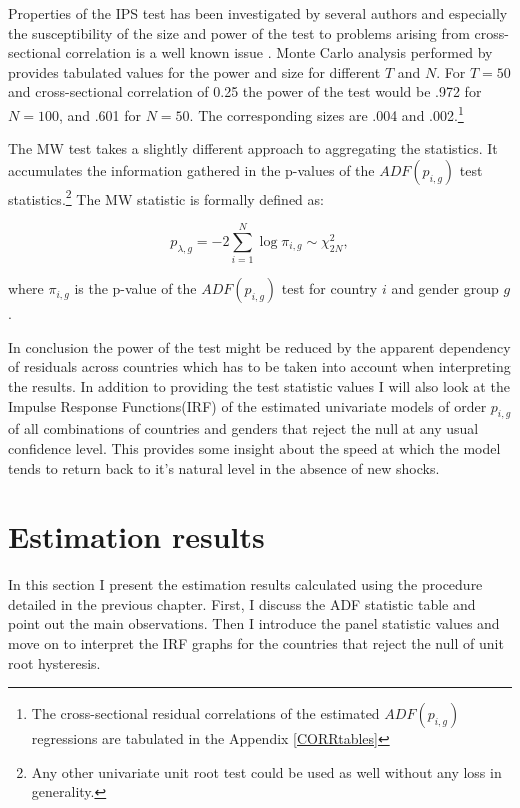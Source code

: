 \documentclass[12pt,a4paper,english]{article}
\begin{document}
Properties of the IPS test has been investigated by several authors and especially the susceptibility of the size and power of the test to problems arising from cross-sectional correlation is a well known issue \citep{karlsson2000, hoang2006}. Monte Carlo analysis performed by \cite{hoang2006} provides tabulated values for the power and size for different $T$ and $N$. For $T=50$ and cross-sectional correlation of 0.25 the power of the test would be .972 for $N=100$, and .601 for $N=50$. The corresponding sizes are .004 and .002.\footnote{The cross-sectional residual correlations of the estimated $ADF(p_{i,g})$ regressions are tabulated in the Appendix \ref{CORRtables}}

The MW test takes a slightly different approach to aggregating the statistics. It accumulates the information gathered in the p-values of the $ADF(p_{i,g})$ test statistics.\footnote{Any other univariate unit root test could be used as well without any loss in generality.} The MW statistic is formally defined as:

\begin{equation}
p_{\lambda,g} = -2\sum_{i=1}^{N} \log \pi_{i,g} \sim \chi^2_{2N} , 
\end{equation}

where $\pi_{i,g}$ is the p-value of the $ADF(p_{i,g})$ test for country $i$ and gender group $g$. 

In conclusion the power of the test might be reduced by the apparent dependency of residuals across countries which has to be taken into account when interpreting the results. In addition to providing the test statistic values I will also look at the Impulse Response Functions(IRF) of the estimated univariate models of order $p_{i,g}$ of all combinations of countries and genders that reject the null at any usual confidence level. This provides some insight about the speed at which the model tends to return back to it's natural level in the absence of new shocks.


\clearpage
\section{Estimation results}

In this section I present the estimation results calculated using the procedure detailed in the previous chapter. First, I discuss the ADF statistic table and point out the main observations. Then I introduce the panel statistic values and move on to interpret the IRF graphs for the countries that reject the null of unit root hysteresis.
\end{document}
